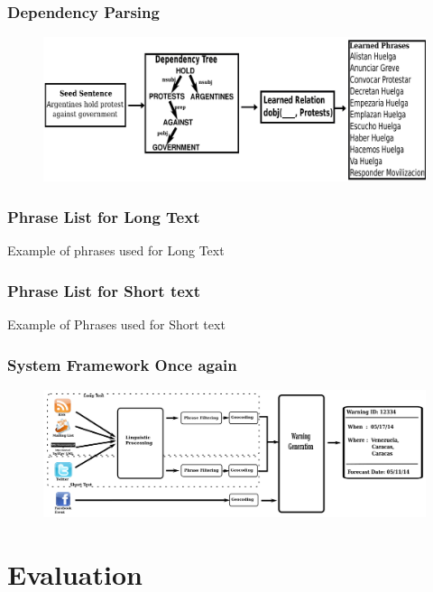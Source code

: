 \documentclass{beamer}
\begin{document}
\begin{frame}
    \frametitle{Dependency Parsing}
    \begin{figure}
        \includegraphics[width=\textwidth]{phraseLearning}
    \end{figure}
\end{frame}

\begin{frame}
    \frametitle{Phrase List for Long Text}
    Example of phrases used for Long Text
\end{frame}


\begin{frame}
    \frametitle{Phrase List for Short text}
    Example of Phrases used for Short text
\end{frame}


\begin{frame}
    \frametitle{System Framework Once again}
    \begin{figure}
        \centering
        \includegraphics[height=0.6\textheight,width=\textwidth]{pipeline}
    \end{figure}
\end{frame}

\section{Evaluation}
\end{document}
